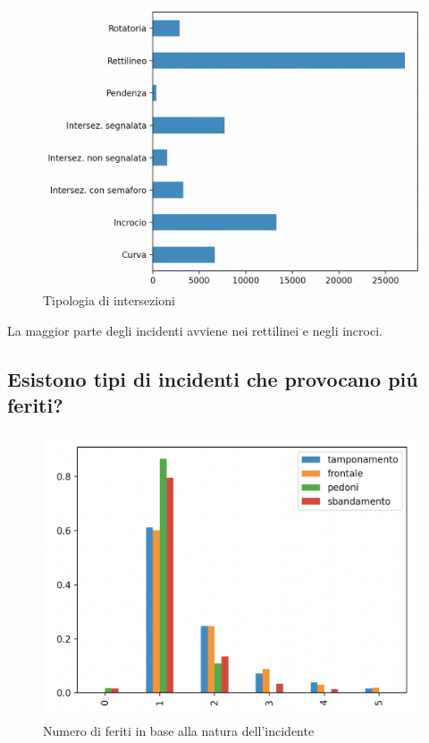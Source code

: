 \documentclass[a4paper]{report}
\begin{document}
\begin{figure}[!ht]
    \includegraphics[width=\linewidth]{../src/incidenti/incidenti_senza_coords/localizzazione_incidente/intersezioni.png}
    \caption{Tipologia di intersezioni}
    \label{fig:tipo_intersezioni}
\end{figure}

La maggior parte degli incidenti avviene nei rettilinei e negli incroci.


\clearpage
\subsection{Esistono tipi di incidenti che provocano pi\'u feriti?}

\begin{figure}[!ht]
    \includegraphics[width=\linewidth]{../src/incidenti/incidenti_senza_coords/natura_incidente/numero_feriti.png}
    \caption{Numero di feriti in base alla natura dell'incidente}
    \label{fig:numero_feriti}
\end{figure}
\end{document}
